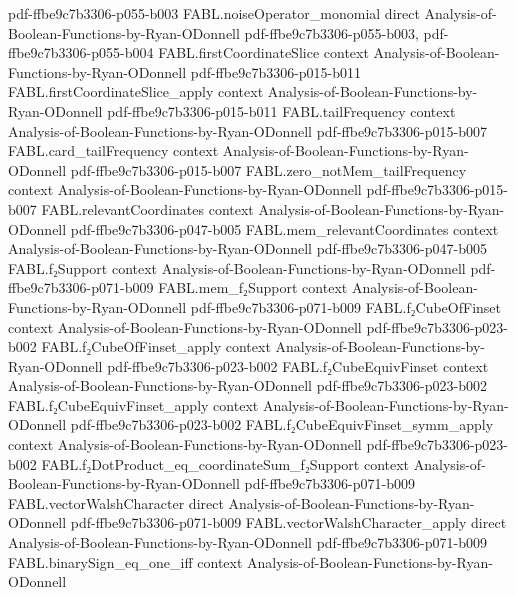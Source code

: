 \begin{theorem}
{    pdf-ffbe9c7b3306-p055-b003}
\proofstep
  {FABL.noiseOperator_monomial}
  {direct}
  {Analysis-of-Boolean-Functions-by-Ryan-ODonnell}
  {pdf-ffbe9c7b3306-p055-b003,
    pdf-ffbe9c7b3306-p055-b004}
\proofstep
  {FABL.firstCoordinateSlice}
  {context}
  {Analysis-of-Boolean-Functions-by-Ryan-ODonnell}
  {pdf-ffbe9c7b3306-p015-b011}
\proofstep
  {FABL.firstCoordinateSlice_apply}
  {context}
  {Analysis-of-Boolean-Functions-by-Ryan-ODonnell}
  {pdf-ffbe9c7b3306-p015-b011}
\proofstep
  {FABL.tailFrequency}
  {context}
  {Analysis-of-Boolean-Functions-by-Ryan-ODonnell}
  {pdf-ffbe9c7b3306-p015-b007}
\proofstep
  {FABL.card_tailFrequency}
  {context}
  {Analysis-of-Boolean-Functions-by-Ryan-ODonnell}
  {pdf-ffbe9c7b3306-p015-b007}
\proofstep
  {FABL.zero_notMem_tailFrequency}
  {context}
  {Analysis-of-Boolean-Functions-by-Ryan-ODonnell}
  {pdf-ffbe9c7b3306-p015-b007}
\proofstep
  {FABL.relevantCoordinates}
  {context}
  {Analysis-of-Boolean-Functions-by-Ryan-ODonnell}
  {pdf-ffbe9c7b3306-p047-b005}
\proofstep
  {FABL.mem_relevantCoordinates}
  {context}
  {Analysis-of-Boolean-Functions-by-Ryan-ODonnell}
  {pdf-ffbe9c7b3306-p047-b005}
\proofstep
  {FABL.f₂Support}
  {context}
  {Analysis-of-Boolean-Functions-by-Ryan-ODonnell}
  {pdf-ffbe9c7b3306-p071-b009}
\proofstep
  {FABL.mem_f₂Support}
  {context}
  {Analysis-of-Boolean-Functions-by-Ryan-ODonnell}
  {pdf-ffbe9c7b3306-p071-b009}
\proofstep
  {FABL.f₂CubeOfFinset}
  {context}
  {Analysis-of-Boolean-Functions-by-Ryan-ODonnell}
  {pdf-ffbe9c7b3306-p023-b002}
\proofstep
  {FABL.f₂CubeOfFinset_apply}
  {context}
  {Analysis-of-Boolean-Functions-by-Ryan-ODonnell}
  {pdf-ffbe9c7b3306-p023-b002}
\proofstep
  {FABL.f₂CubeEquivFinset}
  {context}
  {Analysis-of-Boolean-Functions-by-Ryan-ODonnell}
  {pdf-ffbe9c7b3306-p023-b002}
\proofstep
  {FABL.f₂CubeEquivFinset_apply}
  {context}
  {Analysis-of-Boolean-Functions-by-Ryan-ODonnell}
  {pdf-ffbe9c7b3306-p023-b002}
\proofstep
  {FABL.f₂CubeEquivFinset_symm_apply}
  {context}
  {Analysis-of-Boolean-Functions-by-Ryan-ODonnell}
  {pdf-ffbe9c7b3306-p023-b002}
\proofstep
  {FABL.f₂DotProduct_eq_coordinateSum_f₂Support}
  {context}
  {Analysis-of-Boolean-Functions-by-Ryan-ODonnell}
  {pdf-ffbe9c7b3306-p071-b009}
\proofstep
  {FABL.vectorWalshCharacter}
  {direct}
  {Analysis-of-Boolean-Functions-by-Ryan-ODonnell}
  {pdf-ffbe9c7b3306-p071-b009}
\proofstep
  {FABL.vectorWalshCharacter_apply}
  {direct}
  {Analysis-of-Boolean-Functions-by-Ryan-ODonnell}
  {pdf-ffbe9c7b3306-p071-b009}
\proofstep
  {FABL.binarySign_eq_one_iff}
  {context}
  {Analysis-of-Boolean-Functions-by-Ryan-ODonnell}

\end{theorem}
